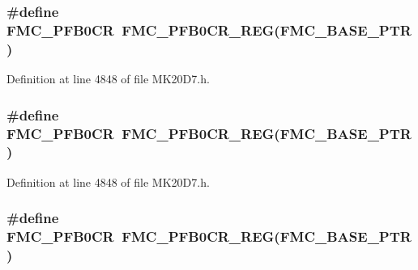 \subsubsection[{\texorpdfstring{F\+M\+C\+\_\+\+P\+F\+B0\+CR}{FMC_PFB0CR}}]{\setlength{\rightskip}{0pt plus 5cm}\#define F\+M\+C\+\_\+\+P\+F\+B0\+CR~{\bf F\+M\+C\+\_\+\+P\+F\+B0\+C\+R\+\_\+\+R\+EG}({\bf F\+M\+C\+\_\+\+B\+A\+S\+E\+\_\+\+P\+TR})}\hypertarget{group___f_m_c___register___accessor___macros_ga6db90dbda9bc68851c6e87c489f18d73}{}\label{group___f_m_c___register___accessor___macros_ga6db90dbda9bc68851c6e87c489f18d73}


Definition at line 4848 of file M\+K20\+D7.\+h.

\subsubsection[{\texorpdfstring{F\+M\+C\+\_\+\+P\+F\+B0\+CR}{FMC_PFB0CR}}]{\setlength{\rightskip}{0pt plus 5cm}\#define F\+M\+C\+\_\+\+P\+F\+B0\+CR~{\bf F\+M\+C\+\_\+\+P\+F\+B0\+C\+R\+\_\+\+R\+EG}({\bf F\+M\+C\+\_\+\+B\+A\+S\+E\+\_\+\+P\+TR})}\hypertarget{group___f_m_c___register___accessor___macros_ga6db90dbda9bc68851c6e87c489f18d73}{}\label{group___f_m_c___register___accessor___macros_ga6db90dbda9bc68851c6e87c489f18d73}


Definition at line 4848 of file M\+K20\+D7.\+h.

\subsubsection[{\texorpdfstring{F\+M\+C\+\_\+\+P\+F\+B0\+CR}{FMC_PFB0CR}}]{\setlength{\rightskip}{0pt plus 5cm}\#define F\+M\+C\+\_\+\+P\+F\+B0\+CR~{\bf F\+M\+C\+\_\+\+P\+F\+B0\+C\+R\+\_\+\+R\+EG}({\bf F\+M\+C\+\_\+\+B\+A\+S\+E\+\_\+\+P\+TR})}\hypertarget{group___f_m_c___register___accessor___macros_ga6db90dbda9bc68851c6e87c489f18d73}{}\label{group___f_m_c___register___accessor___macros_ga6db90dbda9bc68851c6e87c489f18d73}


